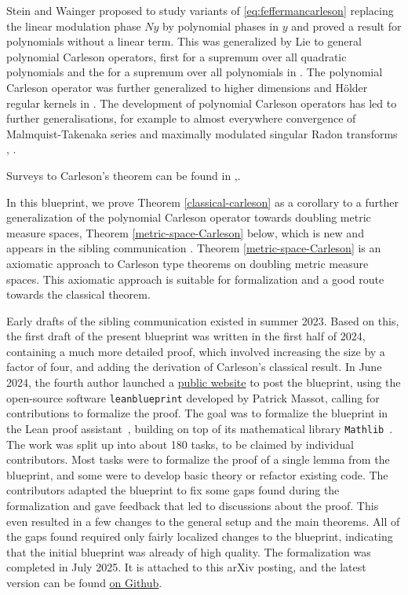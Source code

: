 Stein and Wainger \cite{stein-wainger} proposed to study variants of \eqref{eq:feffermancarleson} replacing the
linear modulation phase $Ny$ by polynomial phases in $y$ and proved a result for polynomials without a linear term.
This was generalized by Lie to general polynomial Carleson operators, first for a supremum over all quadratic
polynomials \cite{lie-quadratic} and the for a supremum over all polynomials in \cite{lie-polynomial}.
The polynomial Carleson operator was further generalized to higher dimensions and H\"older regular kernels in \cite{zk-polynomial}.
The development of polynomial Carleson operators has led to further generalisations, for example to almost everywhere convergence of Malmquist-Takenaka series
\cite{mnatsakanyan} and maximally modulated singular Radon transforms \cite{ramos}, \cite{becker2024maximal}.

Surveys to Carleson's theorem can be found in \cite{MR2091007},\cite{MR3334208}.

In this blueprint, we prove Theorem \ref{classical-carleson} as a corollary to a further generalization of the polynomial Carleson operator towards doubling metric measure spaces,
Theorem \ref{metric-space-Carleson} below,
which is new and appears in the sibling communication \cite{becker2024carlesonoperatorsdoublingmetric}.
Theorem \ref{metric-space-Carleson} is an axiomatic approach to
Carleson type theorems on doubling metric measure spaces.
This axiomatic approach is suitable for formalization and a good route towards the classical theorem.

Early drafts of the sibling communication \cite{becker2024carlesonoperatorsdoublingmetric} existed in summer 2023.
Based on this, the first draft of the present blueprint was written in the first half of 2024,
containing a much more detailed proof, which involved increasing the size by a factor of four,
and adding the derivation of Carleson's classical result.
In June 2024, the fourth author launched a \href{https://florisvandoorn.com/carleson/}{public website}
to post the blueprint, using the open-source software \texttt{leanblueprint} developed by Patrick Massot,
calling for contributions to formalize the proof.
The goal was to formalize the blueprint in the Lean proof assistant~\cite{moura2021lean},
building on top of its mathematical library \texttt{Mathlib}~\cite{mathlib}.
The work was split up into about 180 tasks, to be claimed by individual contributors.
Most tasks were to formalize the proof of a single lemma from the blueprint, and some were to develop basic theory or refactor existing code.
The contributors adapted the blueprint to fix some gaps found during the formalization and gave feedback that led to discussions about the proof.
This even resulted in a few changes to the general setup and the main theorems.
All of the gaps found required only fairly localized changes to the blueprint, indicating that the initial blueprint was already of high quality.
The formalization was completed in July 2025. It is attached to this arXiv posting, and the latest version can be found \href{https://github.com/fpvandoorn/carleson}{on Github}.

